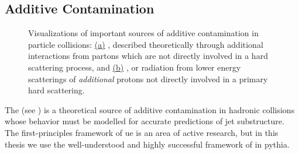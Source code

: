 \begin{subappendices}
\subsection{Additive Contamination}
\label{app:additive-contamination}


\begin{figure}[t]
    \centering
    \caption[Visualizations of additive contamination in particle collisions.]{Visualizations of important sources of additive contamination in particle collisions:
    \hyperref[fig:app-ue]{(a)}
    , described theoretically through additional interactions from partons which are not directly involved in a hard scattering process, and
    \hyperref[fig:app-pu]{(b)}
    , or radiation from lower energy scatterings of \textit{additional} protons not directly involved in a primary hard scattering.
    }
    \label{fig:app-additive-contamination}
\end{figure}


The  (see ) is a theoretical source of additive contamination in hadronic collisions whose behavior must be modelled for accurate predictions of jet substructure.
%
The first-principles framework of \gls{ue} is an area of active research, but in this thesis we use the well-understood and highly successful framework of \textit{} in \gls{pythia}.


\end{subappendices}
